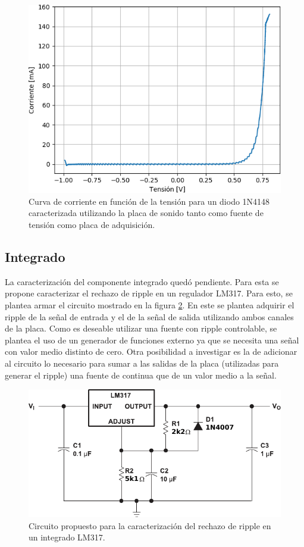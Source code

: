 \documentclass[a4paper,11pt]{article}
\begin{document}
	\begin{figure}[h]
		\centering
		\includegraphics[width=\textwidth]{imagenes/Diodo1N4148.png}
		\caption{Curva de corriente en función de la tensión para un diodo 1N4148 caracterizada utilizando la placa de sonido tanto como fuente de tensión como placa de adquisición.}
		\label{fig:diodo}
	\end{figure}
	
	\subsection{Integrado}	\label{sec:integrado}
	
	La caracterización del componente integrado quedó pendiente. Para esta se propone caracterizar el rechazo de ripple en un regulador LM317. Para esto, se plantea armar el circuito mostrado en la figura \ref{fig:lm317}. En este se plantea adquirir el ripple de la señal de entrada y el de la señal de salida utilizando ambos canales de la placa. Como es deseable utilizar una fuente con ripple controlable, se plantea el uso de un generador de funciones externo ya que se necesita una señal con valor medio distinto de cero. Otra posibilidad a investigar es la de adicionar al circuito lo necesario para sumar a las salidas de la placa (utilizadas para generar el ripple) una fuente de continua que de un valor medio a la señal.
		
	\begin{figure}[h]
		\centering
		\includegraphics[width=\textwidth]{imagenes/lm317.pdf}
		\caption{Circuito propuesto para la caracterización del rechazo de ripple en un integrado LM317.}
		\label{fig:lm317}
	\end{figure}
\end{document}
